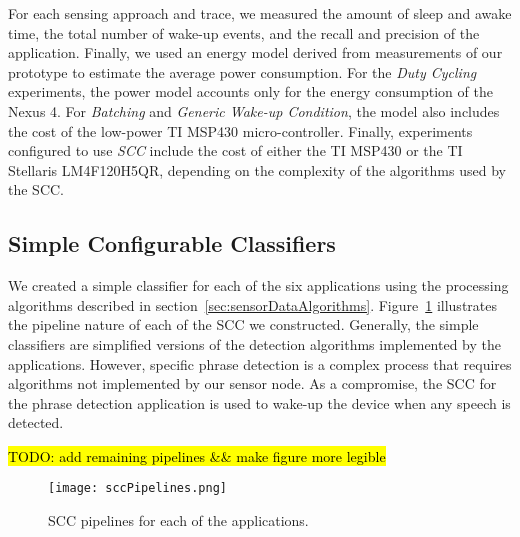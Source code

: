 For each sensing approach and trace, we measured the amount of sleep
and awake time, the total number of wake-up events, and the recall and
precision of the application.  Finally, we used an energy model
derived from measurements of our prototype to estimate
the average power consumption.  For the {\em Duty Cycling} experiments, 
the power model accounts only for the energy
consumption of the Nexus 4.  For {\em Batching} and {\em Generic Wake-up Condition},
the model also includes the cost of the low-power TI MSP430
micro-controller.  Finally, experiments configured to use {\em SCC} include the cost of 
either the TI MSP430 or the TI Stellaris
LM4F120H5QR, depending on the complexity of the algorithms used by the SCC.

\subsection{Simple Configurable Classifiers}
\label{sec:classifiers}

We created a simple classifier for each of the six applications using
the processing algorithms described in section~\ref{sec:sensorDataAlgorithms}. 
Figure~\ref{fig:sccPipelines} illustrates the pipeline nature of each of the 
SCC we constructed.  Generally, the simple classifiers are simplified versions
of the detection algorithms implemented by the applications.  However, specific
phrase detection is a complex process that requires algorithms not implemented
by our sensor node.  As a compromise, the SCC for the phrase detection application
is used to wake-up the device when any speech is detected.

\hl{TODO: add remaining pipelines && make figure more legible}

\begin{figure}[t]
	\texttt{[image: sccPipelines.png]}
	\caption{SCC pipelines for each of the applications.}
	\label{fig:sccPipelines}
\end{figure}



